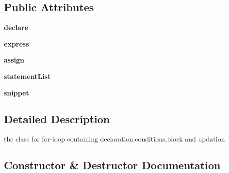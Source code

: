 \subsection*{Public Attributes}
\begin{DoxyCompactItemize}
\item 
{\bfseries declare}\hypertarget{class_parsing_classes_actual_1_1_for_loop_a550adc5c22fce87be47a83598843c706}{}\label{class_parsing_classes_actual_1_1_for_loop_a550adc5c22fce87be47a83598843c706}

\item 
{\bfseries express}\hypertarget{class_parsing_classes_actual_1_1_for_loop_a58bbe234e64342924bef0cf9ad5cb9de}{}\label{class_parsing_classes_actual_1_1_for_loop_a58bbe234e64342924bef0cf9ad5cb9de}

\item 
{\bfseries assign}\hypertarget{class_parsing_classes_actual_1_1_for_loop_abfb0f7260b555ac3390353ba109d5b14}{}\label{class_parsing_classes_actual_1_1_for_loop_abfb0f7260b555ac3390353ba109d5b14}

\item 
{\bfseries statement\+List}\hypertarget{class_parsing_classes_actual_1_1_for_loop_afc8d391270b2b5c29588b16db8e6d4a1}{}\label{class_parsing_classes_actual_1_1_for_loop_afc8d391270b2b5c29588b16db8e6d4a1}

\item 
{\bfseries snippet}\hypertarget{class_parsing_classes_actual_1_1_for_loop_abe6e84aef2f75bcfe3d4048271fc312c}{}\label{class_parsing_classes_actual_1_1_for_loop_abe6e84aef2f75bcfe3d4048271fc312c}

\end{DoxyCompactItemize}


\subsection{Detailed Description}
the class for for-\/loop containing declaration,conditions,block and updation 

\subsection{Constructor \& Destructor Documentation}
